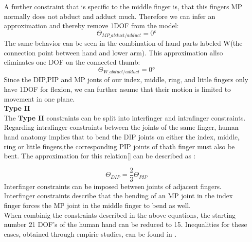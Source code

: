 A further constraint that is specific to the middle finger is, that this fingers MP normally does not abduct and adduct much. Therefore we can infer an approximation and thereby remove 1DOF from the model:
\begin{equation}
\Theta _{MP\_abduct/adduct}=0°
\end{equation}
The same behavior can be seen in the combination of hand parts labeled W(the connection point between hand and lower arm). This approximation allso eliminates one DOF on the connected thumb:
\begin{equation}
\Theta _{W\_abduct/adduct}=0°
\end{equation}
Since the DIP,PIP and MP jonts of our index, middle, ring, and little fingers only have 1DOF for flexion, we can further asume that their motion is limited to movement in one plane. \\
\textbf{Type II}\\
The \textbf{Type II} constraints can be split into interfinger and intrafinger constraints. Regarding intrafinger constraints between the joints of the same finger, human hand anatomy implies that to bend the DIP joints  on  either the index, middle, ring or little fingers,the corresponding PIP joints of thath finger must also be bent. The approximation for this relation[\cite{Rijpkema.1991}] can be described as :

\begin{equation}
\Theta _{DIP} =\frac{2}{3}\Theta _{PIP}
\end{equation}
Interfinger constraints can be imposed between joints of adjacent fingers. Interfinger constraints describe that the bending of an MP joint in the index finger forces the MP joint in the middle finger to bend as well.\\
 When combinig the constraints described in the above equations, the starting number 21 DOF's of the human hand can be reduced to 15. Inequalities for these cases, obtained through empiric studies, can be found in \citep{LEE.1995}.\\
